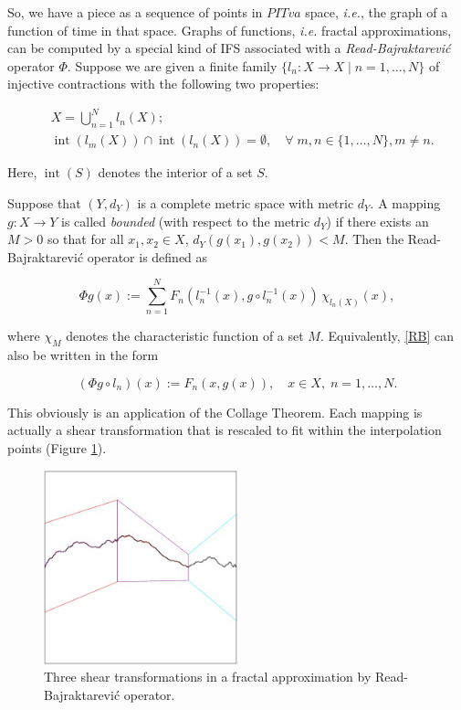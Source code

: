 \documentclass[english,11pt,letterpaper,onecolumn]{scrartcl}
\numberwithin{equation}{section}
\newcommand{\Int}{\mathop{\mathrm{int}}}
\newcommand{\be}{\begin{equation}}
\newcommand{\ee}{\end{equation}}
\begin{document}
So, we have a piece as a sequence of points in $PITva$ space, \textit{i.e.}, 
the graph of a function of time in that space. Graphs of functions, 
\textit{i.e.} fractal approximations, can be computed by a special kind of IFS 
associated with a \textit{Read-Bajraktarevi\'c} operator $\Phi$. Suppose we 
are given a finite family $\{l_n : X\to X \mid n = 1, \ldots, N\}$ of 
injective contractions with the following two properties: 

\begin{align}
&X = \bigcup_{n=1}^N l_n(X);\label{union}\\
&\Int (l_m(X))\cap \Int(l_n(X)) = \emptyset, \quad\forall\;m, n\in \{1,\ldots, 
N\}, m\neq n.\label{partition} 
\end{align}

\noindent Here, $\Int (S)$ denotes the interior of a set $S$.

Suppose that $(Y,d_Y)$ is a complete metric space with metric $d_Y$. A mapping 
$g:X\to Y$ is called \emph{bounded} (with respect to the metric $d_Y$) if 
there exists an $M> 0$ so that for all $x_1, x_2\in X$, $d_Y(g(x_1),g(x_2)) < 
M$. Then the Read-Bajraktarevi\'c operator is defined as

\be\label{RB}
\Phi g (x) := \sum\limits_{n=1}^N F_n (l_n^{-1} (x), g\circ l_n^{-1} 
(x))\,\chi_{l_n(X)}(x), 
\ee

\noindent where $\chi_M$ denotes the characteristic function of a set $M$. 
Equivalently, \eqref{RB} can also be written in the form

\be\label{3.3}
(\Phi g \circ l_n) (x) := F_n (x, g(x)),\quad x\in X, \;n = 1, \ldots, N. 
\ee


This obviously is an application of the Collage Theorem. Each mapping is 
actually a shear transformation that is rescaled 
to fit within the interpolation points (Figure \ref{fig:rboperator}).

    \begin{figure}
        \centerline{\includegraphics[width = 0.5\textwidth]{interp}}
        \caption{\label{fig:rboperator} Three shear transformations in 
a fractal approximation by Read-Bajraktarevi\'c 
operator.\protect\footnotemark}
    \end{figure}
\end{document}
